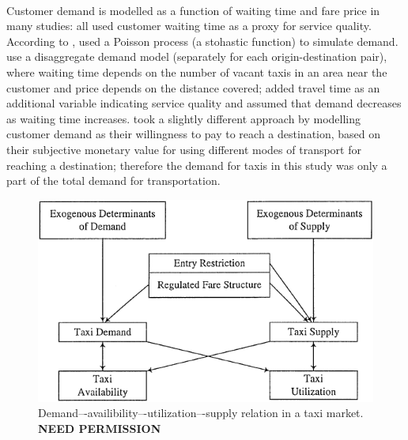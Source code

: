 \paragraph{}Customer demand is modelled as a function of waiting time and fare
price in many studies: \textcite{Douglas1972taxi+regulation,
Devany1975taxi+capacity, Cairns1996taxi+competition, Yang2002taxi+demand} all
used customer waiting time as a proxy for service quality. According to
\textcite{Salanova2011taxi+review}, \textcite{Manski1967taxi+demand} used a
Poisson process (a stohastic function) to simulate demand.
\textcite{Yang2002taxi+demand} use a disaggregate demand model (separately for
each origin-destination pair), where waiting time depends on the number of
vacant taxis in an area near the customer and price depends on the distance
covered; \textcite{Yang2010taxi+nonlinear} added travel time as an additional
variable indicating service quality and assumed that demand decreases as
waiting time increases. \textcite{Yang2010taxi+equilibria} took a slightly
different approach by modelling customer demand as their willingness to pay to
reach a destination, based on their subjective monetary value for using
different modes of transport for reaching a destination; therefore the demand
for taxis in this study was only a part of the total demand for transportation.


\begin{figure}
  \begin{center}
    \includegraphics{../figures/taxi_demand}
    \caption{
      Demand–-availibility–-utilization–-supply relation in a taxi market. 
      \textbf{NEED PERMISSION}
      \label{figure:taxi}
    }
  \end{center}
\end{figure}

